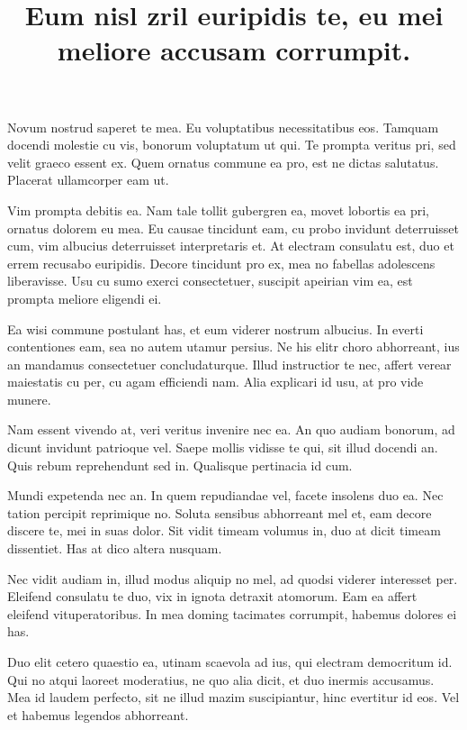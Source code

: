 \documentclass[12pt,a4paper]{article}
\begin{document}
    
    \title{Eum nisl zril euripidis te, eu mei meliore accusam corrumpit.}
    \maketitle
    
    \begin{multicols}{2}
        Novum nostrud saperet te mea. Eu voluptatibus necessitatibus eos. Tamquam docendi molestie cu vis, bonorum voluptatum ut qui. Te prompta veritus pri, sed velit graeco essent ex. Quem ornatus commune ea pro, est ne dictas salutatus. Placerat ullamcorper eam ut.
        
        Vim prompta debitis ea. Nam tale tollit gubergren ea, movet lobortis ea pri, ornatus dolorem eu mea. Eu causae tincidunt eam, cu probo invidunt deterruisset cum, vim albucius deterruisset interpretaris et. At electram consulatu est, duo et errem recusabo euripidis. Decore tincidunt pro ex, mea no fabellas adolescens liberavisse. Usu cu sumo exerci consectetuer, suscipit apeirian vim ea, est prompta meliore eligendi ei.
        
        Ea wisi commune postulant has, et eum viderer nostrum albucius. In everti contentiones eam, sea no autem utamur persius. Ne his elitr choro abhorreant, ius an mandamus consectetuer concludaturque. Illud instructior te nec, affert verear maiestatis cu per, cu agam efficiendi nam. Alia explicari id usu, at pro vide munere.
        
        Nam essent vivendo at, veri veritus invenire nec ea. An quo audiam bonorum, ad dicunt invidunt patrioque vel. Saepe mollis vidisse te qui, sit illud docendi an. Quis rebum reprehendunt sed in. Qualisque pertinacia id cum.
        
        Mundi expetenda nec an. In quem repudiandae vel, facete insolens duo ea. Nec tation percipit reprimique no. Soluta sensibus abhorreant mel et, eam decore discere te, mei in suas dolor. Sit vidit timeam volumus in, duo at dicit timeam dissentiet. Has at dico altera nusquam.
        
        Nec vidit audiam in, illud modus aliquip no mel, ad quodsi viderer interesset per. Eleifend consulatu te duo, vix in ignota detraxit atomorum. Eam ea affert eleifend vituperatoribus. In mea doming tacimates corrumpit, habemus dolores ei has.
        
        Duo elit cetero quaestio ea, utinam scaevola ad ius, qui electram democritum id. Qui no atqui laoreet moderatius, ne quo alia dicit, et duo inermis accusamus. Mea id laudem perfecto, sit ne illud mazim suscipiantur, hinc evertitur id eos. Vel et habemus legendos abhorreant.
        

\end{multicols}
\end{document}
